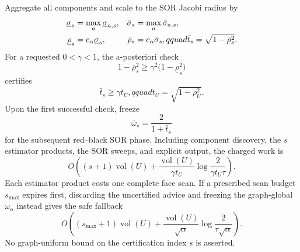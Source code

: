 \begin{proposition}
Aggregate all components and scale to the SOR Jacobi radius by
\begin{align}
 \underline\sigma_s&=\max_a\underline\sigma_{a,s},&
 \bar\sigma_s&=\max_a\bar\sigma_{a,s},\notag\\
 \underline\rho_s&=c_\alpha\underline\sigma_s,&
 \bar\rho_s&=c_\alpha\bar\sigma_s,qquad
 \bar t_s=\sqrt{1-\bar\rho_s^2}.
 \label{eq:collatz-aggregate-interval}
\end{align}
For a requested $0<\gamma<1$, the a-posteriori check
\begin{equation}
 1-\bar\rho_s^2
 \ge\gamma^2\bigl(1-\underline\rho_s^2\bigr)
 \label{eq:collatz-relative-certificate}
\end{equation}
certifies
\begin{equation}
 \bar t_s\ge\gamma t_U,qquad
 t_U=\sqrt{1-\rho_U^2}.
 \label{eq:collatz-relative-gap}
\end{equation}
Upon the first successful check, freeze
\begin{equation}
 \bar\omega_s=\frac{2}{1+\bar t_s}
 \label{eq:collatz-frozen-omega}
\end{equation}
for the subsequent red--black SOR phase.  Including component discovery, the
$s$ estimator products, the SOR sweeps, and explicit output, the charged work
is
\begin{equation}
 O\!\left(
  (s+1)\operatorname{vol}(U)
  +\frac{\operatorname{vol}(U)}{\gamma t_U}
   \log\frac{2}{\gamma t_U\tau}
 \right).
 \label{eq:collatz-certified-work}
\end{equation}
Each estimator product costs one complete face scan.  If a prescribed scan
budget $s_{\max}$ expires first, discarding the uncertified advice and freezing
the graph-global $\omega_\alpha$ instead gives the safe fallback
\begin{equation}
 O\!\left(
  (s_{\max}+1)\operatorname{vol}(U)
  +\frac{\operatorname{vol}(U)}{\sqrt\alpha}
   \log\frac{2}{\tau\sqrt\alpha}
 \right).
 \label{eq:collatz-global-fallback-work}
\end{equation}
No graph-uniform bound on the certification index $s$ is asserted.
\end{proposition}

